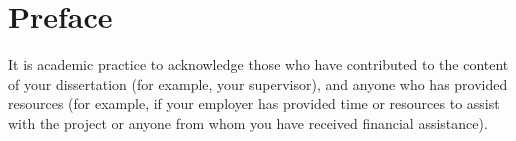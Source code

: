 \section*{Preface}
It is academic practice to acknowledge those who have contributed to the content of your dissertation (for example, your supervisor), and anyone who has provided resources (for example, if your employer has provided time or resources to assist with the project or anyone from whom you have received financial assistance).
